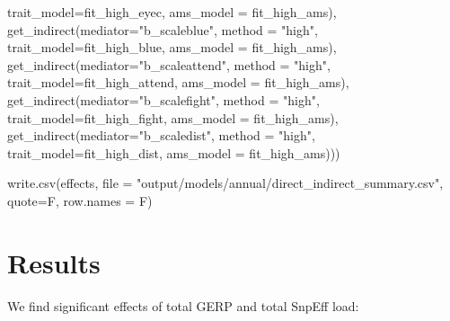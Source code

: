 \documentclass[
  letterpaper,
  DIV=11,
  numbers=noendperiod]{scrreprt}
\newenvironment{Shaded}{}{}
\newcommand{\AttributeTok}[1]{\textcolor[rgb]{0.84,0.23,0.29}{#1}}
\newcommand{\FunctionTok}[1]{\textcolor[rgb]{0.44,0.26,0.76}{#1}}
\newcommand{\NormalTok}[1]{\textcolor[rgb]{0.14,0.16,0.18}{#1}}
\newcommand{\StringTok}[1]{\textcolor[rgb]{0.01,0.18,0.38}{#1}}
\begin{document}
\begin{Shaded}
\begin{Highlighting}[]
                                         \AttributeTok{trait\_model=}\NormalTok{fit\_high\_eyec, }\AttributeTok{ams\_model =}\NormalTok{ fit\_high\_ams),}
                            \FunctionTok{get\_indirect}\NormalTok{(}\AttributeTok{mediator=}\StringTok{"b\_scaleblue"}\NormalTok{,  }\AttributeTok{method =} \StringTok{"high"}\NormalTok{, }
                                         \AttributeTok{trait\_model=}\NormalTok{fit\_high\_blue, }\AttributeTok{ams\_model =}\NormalTok{ fit\_high\_ams),}
                            \FunctionTok{get\_indirect}\NormalTok{(}\AttributeTok{mediator=}\StringTok{"b\_scaleattend"}\NormalTok{,  }\AttributeTok{method =} \StringTok{"high"}\NormalTok{, }
                                         \AttributeTok{trait\_model=}\NormalTok{fit\_high\_attend, }\AttributeTok{ams\_model =}\NormalTok{ fit\_high\_ams),}
                            \FunctionTok{get\_indirect}\NormalTok{(}\AttributeTok{mediator=}\StringTok{"b\_scalefight"}\NormalTok{,  }\AttributeTok{method =} \StringTok{"high"}\NormalTok{, }
                                         \AttributeTok{trait\_model=}\NormalTok{fit\_high\_fight, }\AttributeTok{ams\_model =}\NormalTok{ fit\_high\_ams),}
                            \FunctionTok{get\_indirect}\NormalTok{(}\AttributeTok{mediator=}\StringTok{"b\_scaledist"}\NormalTok{,  }\AttributeTok{method =} \StringTok{"high"}\NormalTok{, }
                                         \AttributeTok{trait\_model=}\NormalTok{fit\_high\_dist, }\AttributeTok{ams\_model =}\NormalTok{ fit\_high\_ams)))}


\FunctionTok{write.csv}\NormalTok{(effects, }\AttributeTok{file =} \StringTok{"output/models/annual/direct\_indirect\_summary.csv"}\NormalTok{, }\AttributeTok{quote=}\NormalTok{F, }\AttributeTok{row.names =}\NormalTok{ F)}
\end{Highlighting}
\end{Shaded}

\hypertarget{results-2}{%
\section{Results}\label{results-2}}

We find significant effects of total GERP and total SnpEff load:
\end{document}
